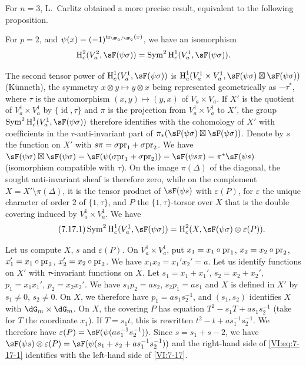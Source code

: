 For $n=3$, L.\ Carlitz \cite{ca69-2} obtained a more precise result,
equivalent to the following proposition. 





\begin{proposition_}\label{VI:7-17}
For $p=2$, and $\psi(x)=(-1)^{\tr_{\dF_q/\dF_q}(x)}$, we have an isomorphism 
\[
  \h_c^2(V_a^2,\sF(\psi\sigma)) = \operatorname{Sym}^2 \h_c^1(V_a^1,\sF(\psi\sigma)) \text{.} 
\]
\end{proposition_}

The second tensor power of $\h_c^1(V_a^1,\sF(\psi\sigma))$ is
$\h_c^1(V_a^1\times V_a^1,\sF(\psi\sigma)\boxtimes \sF(\psi\sigma))$
(K\"unneth), the symmetry $x\otimes y\mapsto y\otimes x$ being represented
geometrically as $-\tau^\ast$, where $\tau$ is the automorphism
$(x,y)\mapsto (y,x)$ of $V_a\times V_a$. If $X'$ is the quotient of
$V_a^1\times V_a^1$ by $\{\operatorname{id}{},\tau\}$ and $\pi$ is the
projection from $V_a^1\times V_a^1$ to $X'$, the group
$\operatorname{Sym}^2 \h_c^1(V_a^1,\sF(\psi\sigma))$ therefore identifies with the
cohomology of $X'$ with coefficients in the $\tau$-anti-invariant part of
$\pi_\ast(\sF(\psi\sigma)\boxtimes \sF(\psi\sigma))$. Denote by $s$ the function
on $X'$ with $s\pi =\sigma\mathrm{pr}_1+\sigma\mathrm{pr}_2$. We have 
$\sF(\psi\sigma)\boxtimes \sF(\psi\sigma) = \sF(\psi(\sigma\pr_1+\sigma\pr_2)) = \sF(\psi s \pi) = \pi^\ast \sF(\psi s)$ 
(isomorphism compatible with $\tau$). On the image $\pi(\Delta)$ of the
diagonal, the sought anti-invariant sheaf is therefore zero, while on
the complement $X=X'\setminus \pi(\Delta)$, it is the tensor product of
$\sF(\psi s)$ with $\varepsilon(P)$, for $\varepsilon$ the unique character
of order $2$ of $\{1,\tau\}$, and $P$ the $\{1,\tau\}$-torsor over $X$ that is the
double covering induced by $V_a^1\times V_a^1$. We have 
\begin{equation*}\tag{7.17.1}\label{VI:eq:7-17-1}
  \operatorname{Sym}^2 \h_c^1(V_a^1,\sF(\psi\sigma)) = \h_c^2(X,\sF(\psi\sigma)\otimes \varepsilon(P)) \text{.}
\end{equation*}

Let us compute $X$, $s$ and $\varepsilon(P)$. On $V_a^1\times V_a^1$, put
$x_1=x_1\circ\mathrm{pr}_1$, $x_2=x_2\circ\mathrm{pr}_2$, $x_1'=x_1\circ \mathrm{pr}_2$,
$x_2'=x_2\circ \mathrm{pr}_2$. We have $x_1 x_2=x_1'x_2'=a$. Let us identify functions on
$X'$ with $\tau$-invariant functions on $X$. Let $s_1=x_1+x_1'$,
$s_2=x_2+x_2'$, $p_1=x_1 x_1'$, $p_2=x_2 x_2'$. We have $s_1 p_2 = a s_2$,
$s_2 p_1 = a s_1$ and $X$ is defined in $X'$ by $s_1\ne 0$, $s_2\ne 0$. On
$X$, we therefore have $p_1 = a s_1 s_2^{-1}$, and $(s_1,s_2)$ identifies $X$ with
$\dG_m\times \dG_m$. On $X$, the covering $P$ has equation
$T^2-s_1 T+a s_1 s_2^{-1}$ (take for $T$ the coordinate $x_1$). If
$T=s_1 t$, this is rewritten $t^2-t+a s_1^{-1} s_2^{-1}$. We therefore have
$\varepsilon(P) = \sF(\psi(a s_1^{-1} s_2^{-1}))$. Since $s=s_1+s-2$, we have
$\sF(\psi s)\otimes \varepsilon(P) = \sF(\psi(s_1+s_2+ a s_1^{-1} s_2^{-1}))$
and the right-hand side of \eqref{VI:eq:7-17-1} identifies with the left-hand side of
\ref{VI:7-17}. 


